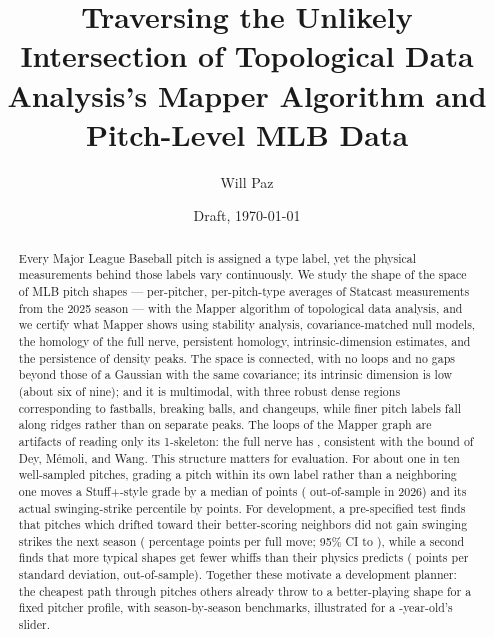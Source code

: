 \documentclass{article}
\title{Traversing the Unlikely Intersection of Topological Data Analysis's Mapper Algorithm and Pitch-Level MLB Data}
\author{Will Paz}
\date{Draft, \today}
\theoremstyle{definition}
\theoremstyle{remark}
\begin{document}
\maketitle

\begin{abstract}
Every Major League Baseball pitch is assigned a type label, yet the physical measurements behind those labels vary continuously.
We study the shape of the space of MLB pitch shapes --- \NShapes{} per-pitcher, per-pitch-type averages of \NFeatures{} Statcast measurements from the 2025 season --- with the Mapper algorithm of topological data analysis, and we certify what Mapper shows using stability analysis, covariance-matched null models, the homology of the full nerve, persistent homology, intrinsic-dimension estimates, and the persistence of density peaks.
The space is connected, with no loops and no gaps beyond those of a Gaussian with the same covariance; its intrinsic dimension is low (about six of nine); and it is multimodal, with three robust dense regions corresponding to fastballs, breaking balls, and changeups, while finer pitch labels fall along ridges rather than on separate peaks.
The \GraphBone{} loops of the Mapper graph are artifacts of reading only its 1-skeleton: the full nerve has \NerveBone, consistent with the bound of Dey, M\'emoli, and Wang.
This structure matters for evaluation. For about one in ten well-sampled pitches, grading a pitch within its own label rather than a neighboring one moves a Stuff+-style grade by a median of \LSTwentyFiveShift{} points (\LSTwentySixShift{} out-of-sample in 2026) and its actual swinging-strike percentile by \LSTwentyFivePctChange{} points.
For development, a pre-specified test finds that pitches which drifted toward their better-scoring neighbors did not gain swinging strikes the next season (\DevBetterBeta{} percentage points per full move; 95\% CI \DevBetterLo{} to \DevBetterHi), while a second finds that more typical shapes get fewer whiffs than their physics predicts (\TypBeta{} points per standard deviation, out-of-sample). Together these motivate a development planner: the cheapest path through pitches others already throw to a better-playing shape for a fixed pitcher profile, with season-by-season benchmarks, illustrated for a \JumpAge-year-old's slider.
\end{abstract}

\end{document}
